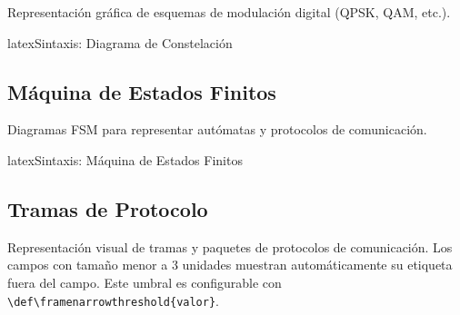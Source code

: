 Representación gráfica de esquemas de modulación digital (QPSK, QAM, etc.).

\begin{codigosimple}{latex}{Sintaxis: Diagrama de Constelación}
\begin{constellationbox}[Título]
\end{constellationbox}
\end{codigosimple}

\begin{constellationbox}
\end{constellationbox}

\subsection{Máquina de Estados Finitos}
\label{subsec:fsm}

Diagramas FSM para representar autómatas y protocolos de comunicación.

\begin{codigosimple}{latex}{Sintaxis: Máquina de Estados Finitos}
\begin{fsmdiagram}
\end{fsmdiagram}
\end{codigosimple}

\begin{fsmdiagram}
\end{fsmdiagram}

\subsection{Tramas de Protocolo}
\label{subsec:tramas}

Representación visual de tramas y paquetes de protocolos de comunicación.
Los campos con tamaño menor a 3 unidades muestran automáticamente su etiqueta
fuera del campo. Este umbral es configurable con \verb|\def\framenarrowthreshold{valor}|.


